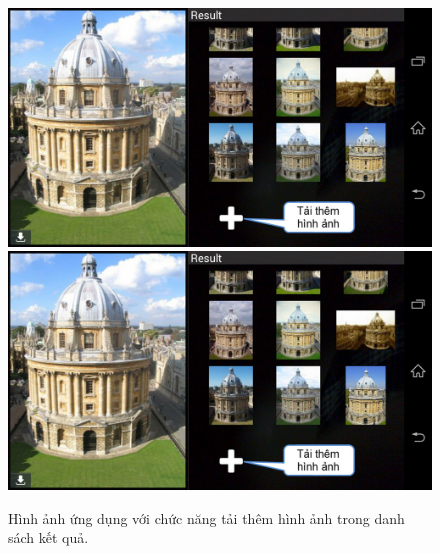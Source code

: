{\begin{figure}[!htbp]
  \begin{center}
    \leavevmode
    \ifpdf
      \includegraphics[scale=0.17]{interface_5}
    \else
      \includegraphics[scale=0.17]{interface_5}
    \fi
    \caption[Hình ảnh ứng dụng với chức năng tải thêm hình ảnh trong danh sách kết quả truy vấn. Khi hoàn tất xử lý, server chỉ trả về cho ứng dụng một số hình ảnh đứng đầu danh sách xếp hạng, người dùng có thể tải thêm các hình ảnh khác bằng cách chạm vào dấu cộng như trên hình, với số lượng hình ảnh tối đa có thể tải là 50 hình.]{Hình ảnh ứng dụng với chức năng tải thêm hình ảnh trong danh sách kết quả.}
    \label{FigChooseRegion}
  \end{center}
\end{figure}

}
